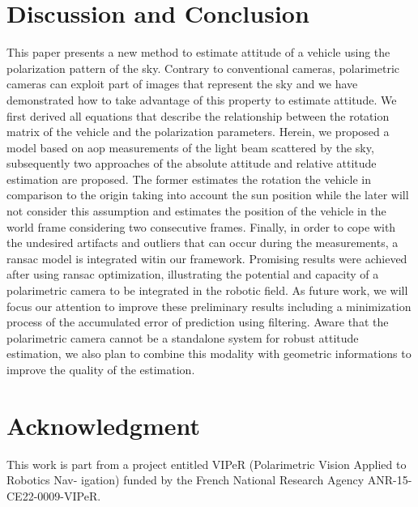 \section{Discussion and Conclusion}
\label{sec:dis-con}

This paper presents a new method to estimate attitude of a vehicle using the
polarization pattern of the sky.  Contrary to conventional cameras,
polarimetric cameras can exploit part of images that represent the sky and we
have demonstrated how to take advantage of this property to estimate
attitude. We first derived all equations that describe the relationship between
the rotation matrix of the vehicle and the polarization parameters.
Herein, we proposed a model based on \gls{aop} measurements of the light beam
scattered by the sky, subsequently two approaches of the absolute attitude and
relative attitude estimation are proposed.  The former estimates the rotation
the vehicle in comparison to the origin taking into account the sun position
while the later will not consider this assumption and estimates the position of
the vehicle in the world frame considering two consecutive frames.
Finally, in order to cope with the undesired artifacts and outliers that can
occur during the measurements, a \gls{ransac} model is integrated witin our
framework.  Promising results were achieved after using \gls{ransac} optimization,
illustrating the potential and capacity of a polarimetric camera to be
integrated in the robotic field.  As future work, we will focus our attention
to improve these preliminary results including a minimization process of the
accumulated error of prediction using filtering. Aware that the polarimetric
camera cannot be a standalone system for robust attitude estimation, we also
plan to combine this modality with geometric informations to improve the quality
of the estimation.


\section{Acknowledgment}
\label{sec:ack}
This work is part from a project entitled VIPeR (Polarimetric Vision Applied to Robotics Nav-
igation) funded by the French National Research Agency ANR-15-CE22-0009-VIPeR.


